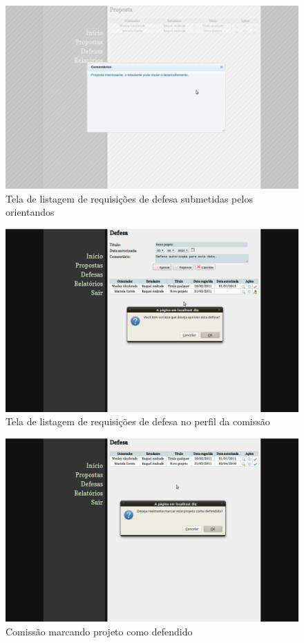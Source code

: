 \begin{figure}[htbp]
\centering
\includegraphics[width=1\textwidth]{fig/telas/processo/comissao_04_comentarios.png}
\caption{Tela de listagem de requisições de defesa submetidas pelos orientandos}
\label{fig:comissao_04_comentarios}
\end{figure}

\begin{figure}[htbp]
\centering
\includegraphics[width=1\textwidth]{fig/telas/processo/comissao_05_aprovando_defesa.png}
\caption{Tela de listagem de requisições de defesa no perfil da comissão}
\label{fig:comissao_05_aprovando_defesa}
\end{figure}

\begin{figure}[htbp]
\centering
\includegraphics[width=1\textwidth]{fig/telas/processo/comissao_06_marcando_projeto_como_defendido.png}
\caption{Comissão marcando projeto como defendido}
\label{fig:comissao_06_marcando_projeto_como_defendido}
\end{figure}

